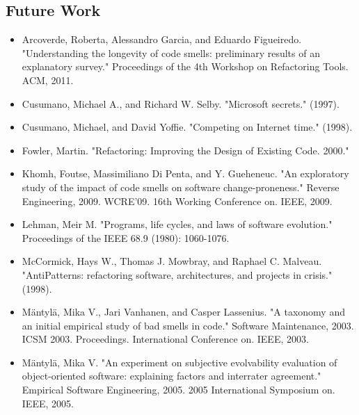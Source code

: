 \documentclass[english,12pt,a4paper,pdftex,sci,utf8]{aaltothesis}
\begin{document}
\subsection{Future Work} \label{future}

\clearpage

{}
\begin{thebibliography}{99}

\begin{itemize}

\item Arcoverde, Roberta, Alessandro Garcia, and Eduardo Figueiredo. "Understanding the longevity of code smells: preliminary results of an explanatory survey." Proceedings of the 4th Workshop on Refactoring Tools. ACM, 2011.

\item Cusumano, Michael A., and Richard W. Selby. "Microsoft secrets." (1997).

\item Cusumano, Michael, and David Yoffie. "Competing on Internet time." (1998).

\item Fowler, Martin. "Refactoring: Improving the Design of Existing Code. 2000."

\item Khomh, Foutse, Massimiliano Di Penta, and Y. Gueheneuc. "An exploratory study of the impact of code smells on software change-proneness." Reverse Engineering, 2009. WCRE'09. 16th Working Conference on. IEEE, 2009.

\item Lehman, Meir M. "Programs, life cycles, and laws of software evolution." Proceedings of the IEEE 68.9 (1980): 1060-1076.

\item McCormick, Hays W., Thomas J. Mowbray, and Raphael C. Malveau. "AntiPatterns: refactoring software, architectures, and projects in crisis." (1998).

\item Mäntylä, Mika V., Jari Vanhanen, and Casper Lassenius. "A taxonomy and an initial empirical study of bad smells in code." Software Maintenance, 2003. ICSM 2003. Proceedings. International Conference on. IEEE, 2003.

\item Mäntylä, Mika V. "An experiment on subjective evolvability evaluation of object-oriented software: explaining factors and interrater agreement." Empirical Software Engineering, 2005. 2005 International Symposium on. IEEE, 2005.


\end{itemize}
\end{thebibliography}
\end{document}
